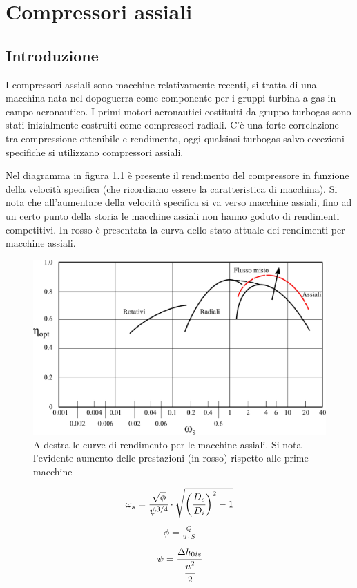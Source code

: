 \chapter{Compressori assiali}

\section{Introduzione}
I compressori assiali sono macchine relativamente recenti, si tratta di una macchina nata nel dopoguerra come componente per i gruppi turbina a gas in campo aeronautico. I primi motori aeronautici costituiti da gruppo turbogas sono stati inizialmente costruiti come compressori radiali. C'è una forte correlazione tra compressione ottenibile e rendimento, oggi qualsiasi turbogas salvo eccezioni specifiche si utilizzano compressori assiali. 

Nel diagramma in figura \ref{fig:PrestComp} è presente il rendimento del compressore in funzione della velocità specifica (che ricordiamo essere la caratteristica di macchina). Si nota che all'aumentare della velocità specifica si va verso macchine assiali, fino ad un certo punto della storia le macchine assiali non hanno goduto di rendimenti competitivi. In rosso è presentata la curva dello stato attuale dei rendimenti per macchine assiali. 
\begin{figure}
\centering
  \includegraphics[width=\textwidth]{fig/PrestComp.pdf}
\caption{A destra le curve di rendimento per le macchine assiali. Si nota l'evidente aumento delle prestazioni (in rosso) rispetto alle prime macchine}
\label{fig:PrestComp}
\end{figure}
\begin{align*}
\omega_s = \cfrac{\sqrt{\phi}}{\psi^{3/4}} \cdot \sqrt{\bigg( \cfrac{D_e}{D_i} \bigg)^2 -1}
\end{align*}
\begin{align*}
\phi = \frac{Q}{u \cdot S}
\end{align*}
\begin{align*}
\psi = \cfrac{\Delta h_{0is}}{\cfrac{u^2}{2}}
\end{align*}

